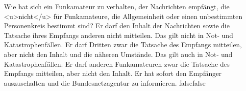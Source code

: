    {Wie hat sich ein Funkamateur zu verhalten, der Nachrichten empfängt, die <u>nicht</u> für Funkamateure, die Allgemeinheit oder einen unbestimmten Personenkreis bestimmt sind?}
    {Er darf den Inhalt der Nachrichten sowie die Tatsache ihres Empfangs anderen nicht mitteilen. Das gilt nicht in Not- und Katastrophenfällen.}
    {Er darf Dritten zwar die Tatsache des Empfangs mitteilen, aber nicht den Inhalt und die näheren Umstände. Das gilt auch in Not- und Katastrophenfällen.}
    {Er darf anderen Funkamateuren zwar die Tatsache des Empfangs mitteilen, aber nicht den Inhalt.}
    {Er hat sofort den Empfänger auszuschalten und die Bundesnetzagentur zu informieren.}
    {false}{false}